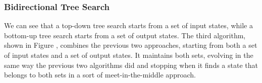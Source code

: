 \subsubsection{Bidirectional Tree Search}
\label{sec:bidirectional-search}

We can see that a top-down tree search starts from a set of input states, while
a bottom-up tree search starts from a set of output states. The third algorithm,
shown in Figure , combines the
previous two approaches, starting from both a set of input states and a set of
output states. It maintains both sets, evolving in the same way the previous two
algorithms did and stopping when it finds a state that belongs to both sets in a
sort of meet-in-the-middle approach.
